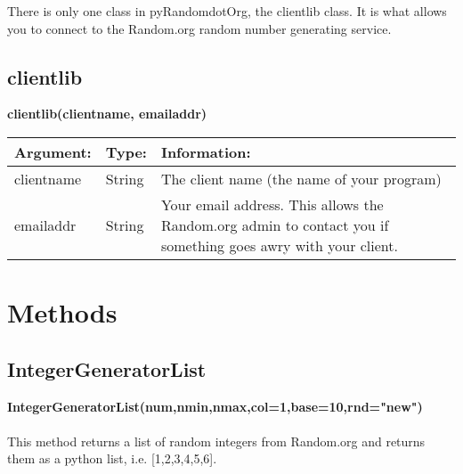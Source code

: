 \documentclass[12 pt]{report}
\begin{document}
There is only one class in pyRandomdotOrg, the clientlib class. It is what allows
you to connect to the Random.org random number generating service.

\subsection{clientlib}

\textbf{clientlib(clientname, emailaddr)}\\

  \begin{tabular}{ | l | l | p{10cm} | }
    \hline
    \textbf{Argument:} & \textbf{Type:} & \textbf{Information:} \\ \hline
    clientname & String & The client name (the name of your program) \\ \hline
    emailaddr & String & Your email address. This allows the Random.org admin to contact you if something goes awry with your client. \\
    \hline
  \end{tabular}


\section{Methods}

\subsection{IntegerGeneratorList}

\textbf{IntegerGeneratorList(num,nmin,nmax,col=1,base=10,rnd="new")}\\\\
This method returns a list of random integers from Random.org and returns them as a python list, i.e. [1,2,3,4,5,6].\\\\
\end{document}
